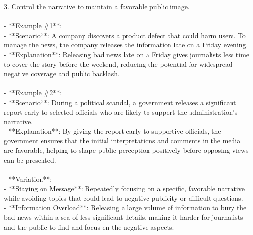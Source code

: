 \documentclass[a4paper,12pt,single,pdftex]{scrartcl}
\begin{document}
    
        3. Control the narrative to maintain a favorable public image.
    \\

    
      
    \\

    
      - **Example \#1**:
    \\

    
        - **Scenario**: A company discovers a product defect that could harm users. To manage the news, the company releases the information late on a Friday evening.
    \\

    
        - **Explanation**: Releasing bad news late on a Friday gives journalists less time to cover the story before the weekend, reducing the potential for widespread negative coverage and public backlash.
    \\

    
      
    \\

    
      - **Example \#2**:
    \\

    
        - **Scenario**: During a political scandal, a government releases a significant report early to selected officials who are likely to support the administration's narrative.
    \\

    
        - **Explanation**: By giving the report early to supportive officials, the government ensures that the initial interpretations and comments in the media are favorable, helping to shape public perception positively before opposing views can be presented.
    \\

    
      
    \\

    
      - **Variation**:
    \\

    
        - **Staying on Message**: Repeatedly focusing on a specific, favorable narrative while avoiding topics that could lead to negative publicity or difficult questions.
    \\

    
        - **Information Overload**: Releasing a large volume of information to bury the bad news within a sea of less significant details, making it harder for journalists and the public to find and focus on the negative aspects.
    \\
\end{document}
